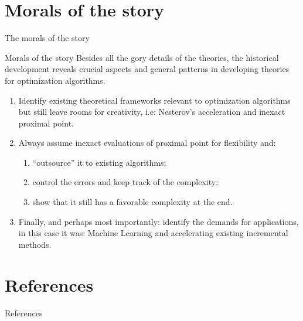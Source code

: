 \documentclass[11pt]{beamer}
\begin{document}
\section{Morals of the story}
    \begin{frame}{The morals of the story}
        \begin{block}{Morals of the story}
            Besides all the gory details of the theories, the historical development reveals crucial aspects and general patterns in developing theories for optimization algorithms.     
        \end{block}
        \begin{enumerate}
            \item Identify existing theoretical frameworks relevant to optimization algorithms but still leave rooms for creativity, 
            i.e: Nesterov's acceleration and inexact proximal point. 
            \item Always assume inexact evaluations of proximal point for flexibility and: 
            \begin{enumerate}
                \item ``outsource'' it to existing algorithms;
                \item control the errors and keep track of the complexity; 
                \item show that it still has a favorable complexity at the end. 
            \end{enumerate}
            \item Finally, and perhaps most importantly: identify the demands for applications, in this case it was: Machine Learning and accelerating existing incremental methods. 
        \end{enumerate}
    \end{frame}
    
\section{References}
    \begin{frame}{References}
        \tiny
    \end{frame}
\end{document}
